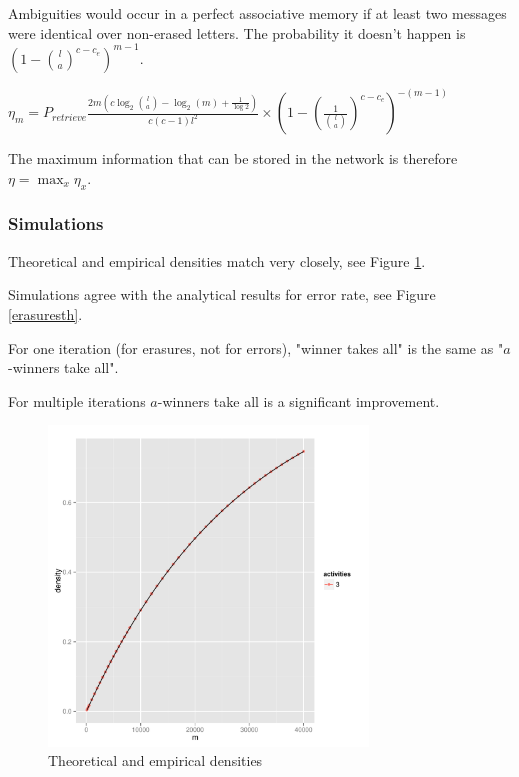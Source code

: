 \documentclass[english,11pt,twocolumn]{article}
\theoremstyle{definition}
\begin{document}
	Ambiguities would occur in a perfect associative memory if at least two messages were identical over non-erased letters. The probability it doesn't happen is $ (1-{l \choose a}^{c - c_e})^{m-1}$.
	
	
	$\eta_m = P_{retrieve}  \frac{2 m\left(c \log_2{l \choose a } - \log_2(m) + \frac{1}{\log 2} \right)}{c(c-1)l^2} \times (1-(\frac{1}{{l \choose a}})^{c - c_e})^{-(m-1)}$
	
	The maximum information that can be stored in the network is therefore $\eta = \max_x \eta_x $.
	
	\subsubsection{Simulations}
		Theoretical and empirical densities match very closely, see Figure \ref{densiteth}. %
		
		
		
		Simulations agree with the analytical results for error rate, see Figure \ref{erasuresth}.
	

	For one iteration (for erasures, not for errors), "winner takes all" is the same as "$a$-winners take all".
	
	For multiple iterations $a$-winners take all is a significant improvement.
	
	
		
	\begin{figure}[!htb]
		\includegraphics[width=8.5cm]{Courbes/densiteexemple.pdf}
		\caption{Theoretical and empirical densities}
			\label{densiteth}
	\end{figure}
	
\end{document}
